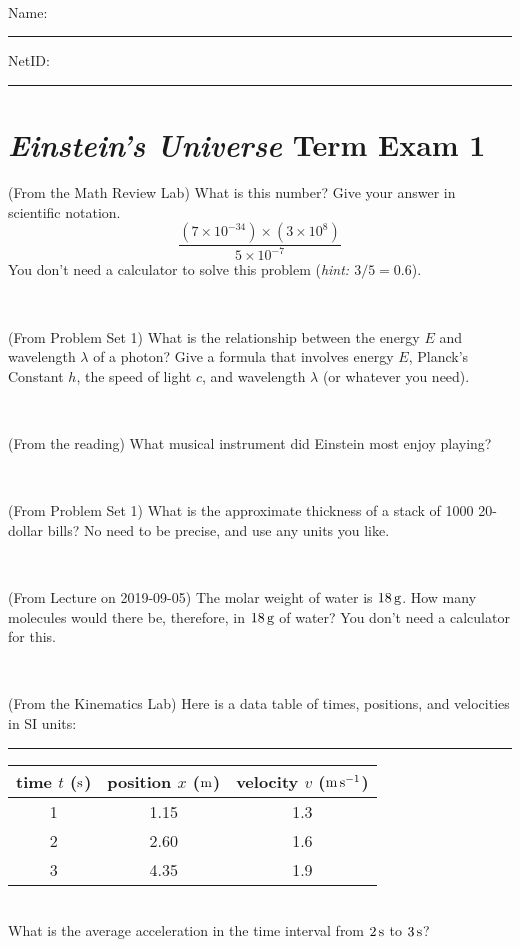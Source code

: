 \documentclass[12pt, letterpaper]{article}
\begin{document}
\vfill ~


\cleardoublepage



\noindent
Name: \rule[-1ex]{0.60\textwidth}{0.1pt}
NetID: \rule[-1ex]{0.20\textwidth}{0.1pt}

\section*{\textsl{Einstein's Universe} Term Exam 1}
\setcounter{problem}{1}


\begin{problem} (From the Math Review Lab)
What is this number? Give your answer in scientific notation.
$$
\frac{(7\times10^{-34})\times(3\times10^8)}{5\times10^{-7}}
$$
You don't need a calculator to solve this problem (\textit{hint: $3/5=0.6$}).
\end{problem}


\vfill ~

\begin{problem} (From Problem Set 1)
What is the relationship between the energy $E$ and wavelength
$\lambda$ of a photon? Give a formula that involves energy $E$,
Planck's Constant $h$, the speed of light $c$, and wavelength
$\lambda$ (or whatever you need).
\end{problem}

\vfill ~

\begin{problem} (From the reading)
What musical instrument did Einstein most enjoy playing?
\end{problem}


\vfill ~

\begin{problem} (From Problem Set 1)
What is the approximate thickness of a stack of 1000 20-dollar bills?
No need to be precise, and use any units you like.
\end{problem}


\vfill ~


\clearpage


\begin{problem} (From Lecture on 2019-09-05)
The molar weight of water is $18\,\mathrm{g}$. How many molecules would there
be, therefore, in $18\,\mathrm{g}$ of water? You don't need a calculator for
this.
\end{problem}


\vfill ~

\begin{problem} (From the Kinematics Lab)
Here is a data table of times, positions, and velocities in SI units:\\
\rule{1.0in}{0pt}\begin{tabular}{c|c|c}
time $t$ ($\mathrm{s}$) & position $x$ ($\mathrm{m}$) & velocity $v$ ($\mathrm{m}\,\mathrm{s}^{-1}$) \\
\hline
1 & 1.15 & 1.3 \\
2 & 2.60 & 1.6 \\
3 & 4.35 & 1.9 \\
\hline
\end{tabular}\\
What is the average acceleration in the time interval from $2\,\mathrm{s}$ to $3\,\mathrm{s}$?
\end{problem}
\end{document}
